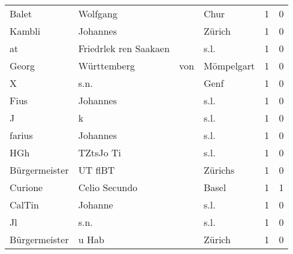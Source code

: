 \begin{tabular}{llllrr}
                    Balet &                           Wolfgang &             &                                        Chur &          1 &         0 \\
                   Kambli &                           Johannes &             &                                      Zürich &          1 &         0 \\
                       at &              Friedrlek ren Saakaen &             &                                        s.l. &          1 &         0 \\
                    Georg &                        Württemberg &         von &                                  Mömpelgart &          1 &         0 \\
                        X &                               s.n. &             &                                        Genf &          1 &         0 \\
                     Fius &                           Johannes &             &                                        s.l. &          1 &         0 \\
                        J &                                  k &             &                                        s.l. &          1 &         0 \\
                   farius &                           Johannes &             &                                        s.l. &          1 &         0 \\
                      HGh &                          TZtsJo Ti &             &                                        s.l. &          1 &         0 \\
            Bürgermeister &                            UT flBT &             &                                     Zürichs &          1 &         0 \\
                  Curione &                      Celio Secundo &             &                                       Basel &          1 &         1 \\
                   CalTin &                            Johanne &             &                                        s.l. &          1 &         0 \\
                       Jl &                               s.n. &             &                                        s.l. &          1 &         0 \\
            Bürgermeister &                              u Hab &             &                                      Zürich &          1 &         0 \\

\end{tabular}
